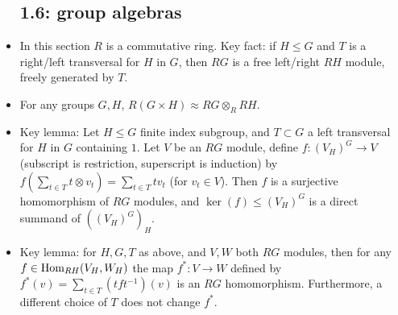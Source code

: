 \documentclass[11pt]{amsart}
\begin{document}
\begin{itemize}
  \subsection{1.6: group algebras}
  \item In this section $R$ is a commutative ring. Key fact: if $H \leq G$ and $T$ is a right/left transversal for $H$ in $G$, then $RG$ is a free left/right $RH$ module, freely generated by $T$.
  \item For any groups $G,H$, $R(G\times H) \approx RG \otimes_R RH$. 
  \item Key lemma: Let $H \leq G$ finite index subgroup, and $T \subset G$ a left transversal for $H$ in $G$ containing $1$. Let $V$ be an $RG$ module, define $f: (V_H)^G \to V$ (subscript is restriction, superscript is induction) by $f(\sum_{t \in T} t \otimes v_t ) = \sum_{t\in T} tv_t$ (for $v_t\in V$). Then $f$ is a surjective homomorphism of $RG$ modules, and $\ker(f) \leq (V_H)^G$ is a direct summand of $((V_H)^G)_H$. 
  \item Key lemma: for $H,G,T$ as above, and $V,W$ both $RG$ modules, then for any $f\in \operatorname{Hom}_{RH}(V_H,W_H)$ the map $f^*:V\to W$ defined by $f^*(v) = \sum_{t\in T} (tft^{-1} )(v)$ is an $RG$ homomorphism. Furthermore, a different choice of $T$ does not change $f^*$. 
\end{itemize}
\end{document}
